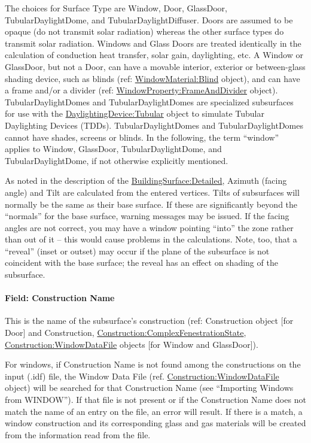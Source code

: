 The choices for Surface Type are Window, Door, GlassDoor, TubularDaylightDome, and TubularDaylightDiffuser. Doors are assumed to be opaque (do not transmit solar radiation) whereas the other surface types do transmit solar radiation. Windows and Glass Doors are treated identically in the calculation of conduction heat transfer, solar gain, daylighting, etc. A Window or GlassDoor, but not a Door, can have a movable interior, exterior or between-glass shading device, such as blinds (ref: \hyperref[windowmaterialblind]{WindowMaterial:Blind} object), and can have a frame and/or a divider (ref: \hyperref[windowpropertyframeanddivider]{WindowProperty:FrameAndDivider} object). TubularDaylightDomes and TubularDaylightDomes are specialized subsurfaces for use with the \hyperref[daylightingdevicetubular]{DaylightingDevice:Tubular} object to simulate Tubular Daylighting Devices (TDDs). TubularDaylightDomes and TubularDaylightDomes cannot have shades, screens or blinds. In the following, the term ``window'' applies to Window, GlassDoor, TubularDaylightDome, and TubularDaylightDome, if not otherwise explicitly mentioned.

As noted in the description of the \hyperref[buildingsurfacedetailed]{BuildingSurface:Detailed}, Azimuth (facing angle) and Tilt are calculated from the entered vertices. Tilts of subsurfaces will normally be the same as their base surface. If these are significantly beyond the ``normals'' for the base surface, warning messages may be issued. If the facing angles are not correct, you may have a window pointing ``into'' the zone rather than out of it -- this would cause problems in the calculations. Note, too, that a ``reveal'' (inset or outset) may occur if the plane of the subsurface is not coincident with the base surface; the reveal has an effect on shading of the subsurface.

\paragraph{Field: Construction Name}\label{field-construction-name-20}

This is the name of the subsurface's construction (ref: Construction object {[}for Door{]} and Construction, \hyperref[constructioncomplexfenestrationstate]{Construction:ComplexFenestrationState}, \hyperref[constructionwindowdatafile]{Construction:WindowDataFile} objects {[}for Window and GlassDoor{]}).

For windows, if Construction Name is not found among the constructions on the input (.idf) file, the Window Data File (ref. \hyperref[constructionwindowdatafile]{Construction:WindowDataFile} object) will be searched for that Construction Name (see ``Importing Windows from WINDOW''). If that file is not present or if the Construction Name does not match the name of an entry on the file, an error will result. If there is a match, a window construction and its corresponding glass and gas materials will be created from the information read from the file.

